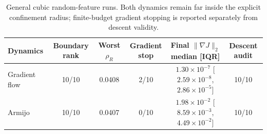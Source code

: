 \begin{table}[t]
\centering
\small
\setlength{\tabcolsep}{4pt}
\renewcommand{\arraystretch}{1.12}
\begin{tabular}{@{}lccccc@{}}
\hline
Dynamics & Boundary rank & Worst $\rho_R$ & Gradient stop & Final $\|\nabla J\|_2$ median [IQR] & Descent audit \\
\hline
Gradient flow & 10/10 & 0.0408 & 2/10 & $1.30\times10^{-7}$ [$2.59\times10^{-8}$,$2.86\times10^{-5}$] & 10/10 \\
Armijo & 10/10 & 0.0407 & 0/10 & $1.98\times10^{-2}$ [$8.59\times10^{-3}$,$4.49\times10^{-2}$] & 10/10 \\
\hline
\end{tabular}
\caption{General cubic random-feature runs. Both dynamics remain far inside the explicit confinement radius; finite-budget gradient stopping is reported separately from descent validity.}
\label{tab:general-confinement}
\end{table}
